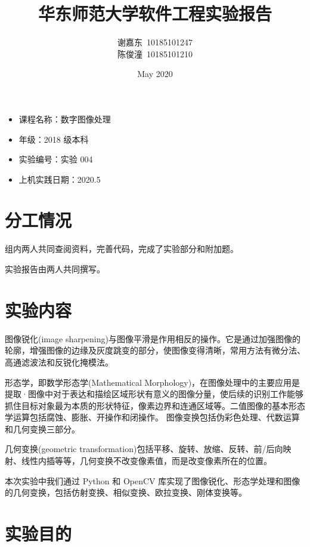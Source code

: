 \documentclass[11pt]{ctexart}
\title{华东师范大学软件工程实验报告}
\author{谢嘉东\ 10185101247\\陈俊潼\ 10185101210}
\date{May 2020}
\begin{document}
\maketitle

\thispagestyle{empty}

\begin{itemize}
    \item 课程名称：数字图像处理
    \item 年级：2018 级本科
    \item 实验编号：实验 004
    \item 上机实践日期：2020.5
\end{itemize}

\tableofcontents

\thispagestyle{empty}

\newpage

\section{分工情况}

组内两人共同查阅资料，完善代码，完成了实验部分和附加题。

实验报告由两人共同撰写。

\section{实验内容}

图像锐化(image sharpening)与图像平滑是作用相反的操作。它是通过加强图像的轮廓，增强图像的边缘及灰度跳变的部分，使图像变得清晰，常用方法有微分法、高通滤波法和反锐化掩模法。

形态学，即数学形态学(Mathematical Morphology)，在图像处理中的主要应用是提取·图像中对于表达和描绘区域形状有意义的图像分量，使后续的识别工作能够抓住目标对象最为本质的形状特征，像素边界和连通区域等。二值图像的基本形态学运算包括腐蚀、膨胀、开操作和闭操作。
图像变换包括伪彩色处理、代数运算和几何变换三部分。

几何变换(geometric transformation)包括平移、旋转、放缩、反转、前/后向映射、线性内插等等，几何变换不改变像素值，而是改变像素所在的位置。

本次实验中我们通过 Python 和 OpenCV 库实现了图像锐化、形态学处理和图像的几何变换，包括仿射变换、相似变换、欧拉变换、刚体变换等。

\section{实验目的}
\end{document}
